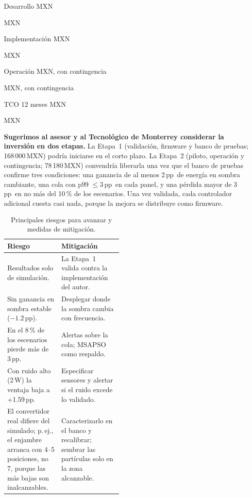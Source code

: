 \documentclass[letterpaper,11pt]{article}
\newcommand{\cifra}[5]{%
  \begingroup\setlength{\fboxsep}{5pt}%
  \colorbox{#1}{\parbox[t]{\dimexpr\linewidth-2\fboxsep\relax}{%
    \setstretch{1}\color{#2}{\Large\bfseries #3}\par
    #4%
    \ifx\relax#5\relax\else\par{\footnotesize #5}\fi}}%
  \endgroup}
\newcommand{\cifragris}[4]{\cifra{black!8}{black}{#1}{#2}{#3}}
\newcommand{\cifraacento}[4]{\cifra{blue!10}{blue!55!black}{#1}{#2}{#3}}
\newcommand{\pp}{\,pp}
\begin{document}
\medskip
\noindent
\begin{minipage}[t]{0.235\linewidth}\cifragris{\$90\,000}{Desarrollo}{MXN}{}\end{minipage}\hfill
\begin{minipage}[t]{0.235\linewidth}\cifragris{\$102\,000}{Implementación}{MXN}{}\end{minipage}\hfill
\begin{minipage}[t]{0.235\linewidth}\cifragris{\$54\,180}{Operación}{MXN, con contingencia}{}\end{minipage}\hfill
\begin{minipage}[t]{0.235\linewidth}\cifraacento{\$246\,180}{TCO 12 meses}{MXN}{}\end{minipage}
\medskip

\textbf{Sugerimos al asesor y al Tecnológico de Monterrey considerar la inversión en dos etapas.} La Etapa~1 (validación, firmware y banco de pruebas; 168\,000\,MXN) podría iniciarse en el corto plazo. La Etapa~2 (piloto, operación y contingencia; 78\,180\,MXN) convendría liberarla una vez que el banco de pruebas confirme tres condiciones: una ganancia de al menos 2\pp\ de energía en sombra cambiante, una cola con p99 $\le 3$\pp\ en cada panel, y una pérdida mayor de 3\pp\ en no más del 10\,\% de los escenarios. Una vez validada, cada controlador adicional cuesta casi nada, porque la mejora se distribuye como firmware.

\begin{table}[h]
\centering\footnotesize{}
\caption{Principales riesgos para avanzar y medidas de mitigación.}
\label{tab:riesgos}
\begin{tabularx}{\linewidth}{@{}p{0.47\linewidth}Y@{}}
\toprule
\textbf{Riesgo} & \textbf{Mitigación}\\
\midrule
Resultados solo de simulación. & La Etapa~1 valida contra la implementación del autor.\\
Sin ganancia en sombra estable ($-1.2$\pp). & Desplegar donde la sombra cambia con frecuencia.\\
En el 8\,\% de los escenarios pierde más de 3\pp. & Alertas sobre la cola; MSAPSO como respaldo.\\
Con ruido alto (2\,W) la ventaja baja a +1.59\pp. & Especificar sensores y alertar si el ruido excede lo validado.\\
El convertidor real difiere del simulado; p.\,ej., el enjambre arranca con 4--5 posiciones, no 7, porque las más bajas son inalcanzables. & Caracterizarlo en el banco y recalibrar; sembrar las partículas solo en la zona alcanzable.\\
\bottomrule
\end{tabularx}
\end{table}
\end{document}
